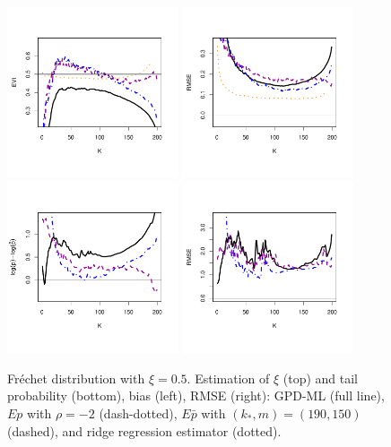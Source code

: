 \documentclass[twoside,leqno,11pt]{article}
\begin{document}
  \begin{figure}[!ht]
  \centering
\includegraphics[width=0.45\textwidth]{frechetGPD_evi.pdf} 
\includegraphics[width=0.45\textwidth]{frechetGPD_rmse.pdf} \\
\includegraphics[width=0.45\textwidth]{frechetGPD_tail.pdf}
\includegraphics[width=0.45\textwidth]{frechetGPD_tail_rmse.pdf}  
 \caption{ Fr\'echet distribution with $\xi=0.5$. Estimation of $\xi$ (top) and tail probability (bottom), bias (left), RMSE (right): GPD-ML (full line), $Ep$ with $\rho=-2$ (dash-dotted), $E\bar{p}$ with $(k_*,m)=(190,150)$ (dashed), and ridge regression estimator (dotted). }
\end{figure}
\end{document}
